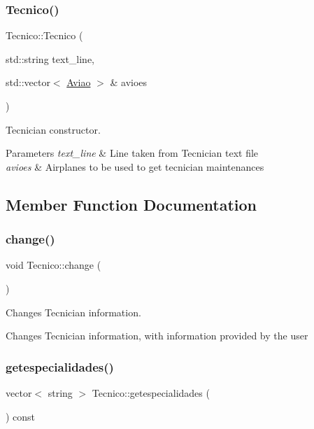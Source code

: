 \subsubsection{\texorpdfstring{Tecnico()}{Tecnico()}\hspace{0.1cm}{\footnotesize\ttfamily [3/3]}}
{\footnotesize\ttfamily Tecnico\+::\+Tecnico (\begin{DoxyParamCaption}\item[{std\+::string}]{text\+\_\+line,  }\item[{std\+::vector$<$ \hyperlink{class_aviao}{Aviao} $>$ \&}]{avioes }\end{DoxyParamCaption})}



Tecnician constructor. 


\begin{DoxyParams}{Parameters}
{\em text\+\_\+line} & Line taken from Tecnician text file \\
\hline
{\em avioes} & Airplanes to be used to get tecnician maintenances \\
\hline
\end{DoxyParams}


\subsection{Member Function Documentation}
\mbox{\label{class_tecnico_a6b628a20bb7c268776e26a29ca8b8a73}} 
\subsubsection{\texorpdfstring{change()}{change()}}
{\footnotesize\ttfamily void Tecnico\+::change (\begin{DoxyParamCaption}{ }\end{DoxyParamCaption})}



Changes Tecnician information. 

Changes Tecnician information, with information provided by the user \mbox{\label{class_tecnico_ad481c5d2e8616a347b26dbd5df431fa1}} 
\subsubsection{\texorpdfstring{getespecialidades()}{getespecialidades()}}
{\footnotesize\ttfamily vector$<$ string $>$ Tecnico\+::getespecialidades (\begin{DoxyParamCaption}{ }\end{DoxyParamCaption}) const}



